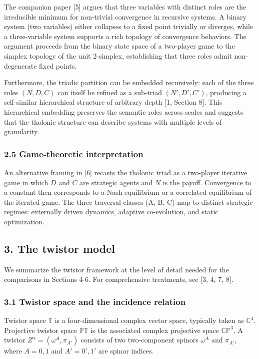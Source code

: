 \documentclass[
  11pt,
  letterpaper,
]{article}
\begin{document}
The companion paper {[}5{]} argues that three variables with distinct
roles are the irreducible minimum for non-trivial convergence in
recursive systems. A binary system (two variables) either collapses to a
fixed point trivially or diverges, while a three-variable system
supports a rich topology of convergence behaviors. The argument proceeds
from the binary state space of a two-player game to the simplex topology
of the unit 2-simplex, establishing that three roles admit
non-degenerate fixed points.

Furthermore, the triadic partition can be embedded recursively: each of
the three roles \((N, D, C)\) can itself be refined as a sub-triad
\((N', D', C')\), producing a self-similar hierarchical structure of
arbitrary depth {[}1, Section 8{]}. This hierarchical embedding
preserves the semantic roles across scales and suggests that the
tholonic structure can describe systems with multiple levels of
granularity.

\subsubsection{2.5 Game-theoretic
interpretation}\label{game-theoretic-interpretation}

An alternative framing in {[}6{]} recasts the tholonic triad as a
two-player iterative game in which \(D\) and \(C\) are strategic agents
and \(N\) is the payoff. Convergence to a constant then corresponds to a
Nash equilibrium or a correlated equilibrium of the iterated game. The
three traversal classes (A, B, C) map to distinct strategic regimes:
externally driven dynamics, adaptive co-evolution, and static
optimization.

\subsection{3. The twistor model}\label{the-twistor-model}

We summarize the twistor framework at the level of detail needed for the
comparisons in Sections 4-6. For comprehensive treatments, see {[}3, 4,
7, 8{]}.

\subsubsection{3.1 Twistor space and the incidence
relation}\label{twistor-space-and-the-incidence-relation}

Twistor space \(\mathbb{T}\) is a four-dimensional complex vector space,
typically taken as \(\mathbb{C}^4\). Projective twistor space
\(\mathbb{PT}\) is the associated complex projective space
\(\mathbb{CP}^3\). A twistor \(Z^\alpha = (\omega^A, \pi_{A'})\)
consists of two two-component spinors \(\omega^A\) and \(\pi_{A'}\),
where \(A = 0, 1\) and \(A' = 0', 1'\) are spinor indices.
\end{document}
